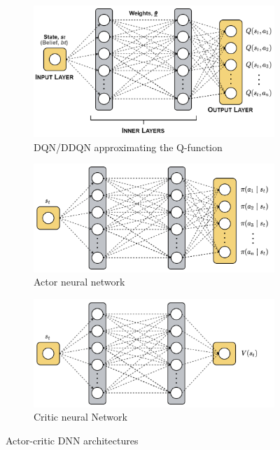 \begin{figure}[H]
    \centering
    \begin{subfigure}[b]{0.7\textwidth}
        \centering
        \includegraphics[width=\textwidth]{Figures/formalDNN.png}
        \caption{\gls{DQN}/\gls{DDQN} approximating the Q-function}
        \label{ddqnNet}
    \end{subfigure}
    \begin{subfigure}[b]{0.48\textwidth}
        \centering
        \includegraphics[width=\textwidth]{Figures/actorNet.png}
        \caption{Actor neural network}
        \label{actorNet}
    \end{subfigure}
    \hfill
    \begin{subfigure}[b]{0.48\textwidth}
        \centering
        \includegraphics[width=\textwidth]{Figures/ctiricNet.png}
        \caption{Critic neural Network}
        \label{criticNet}
    \end{subfigure}
    \caption{Actor-critic \gls{DNN} architectures \protect\footnotemark}
    \label{dnnArchitectures}
\end{figure}


